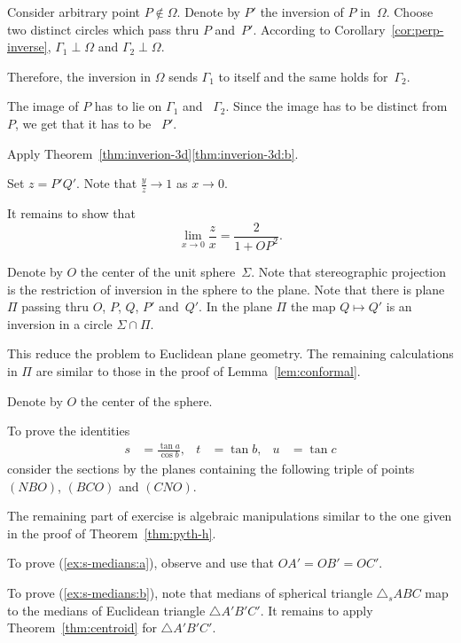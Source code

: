 Consider arbitrary point $P\notin\Omega$.
Denote by $P'$ the inversion of $P$ in~$\Omega$.
Choose two distinct circles which pass thru $P$ and~$P'$.
According to Corollary~\ref{cor:perp-inverse}, 
$\Gamma_1\perp \Omega$ and $\Gamma_2\perp \Omega$.

Therefore, the inversion in $\Omega$ sends $\Gamma_1$ to itself and the same holds for~$\Gamma_2$. 

The image of $P$ has to lie on $\Gamma_1$ and ~$\Gamma_2$.
Since the image has to be distinct from $P$, we get that it has to be ~$P'$.

Apply Theorem~\ref{thm:inverion-3d}\ref{thm:inverion-3d:b}.

Set $z=P'Q'$.
Note that $\tfrac yz\to 1$ as $x\to 0$.

It remains to show that 
$$\lim_{x\to 0} \frac{z}{x}=\frac{2}{1+OP^2}.$$

Denote by $O$ the center of the unit sphere~$\Sigma$.
Note that stereographic projection is the restriction of inversion in the sphere to the plane.
Note that there is plane $\Pi$ passing thru $O$, $P$, $Q$, $P'$ and~$Q'$.
In the plane $\Pi$ the map $Q\mapsto Q'$ is an inversion in a circle $\Sigma\cap \Pi$.

This reduce the problem to Euclidean plane geometry.
The remaining calculations in $\Pi$ are similar to those in the proof of  Lemma~\ref{lem:conformal}.



Denote by $O$ the center of the sphere.

To prove the identities
\begin{align*}
s&=\tfrac{\tan a}{\cos b},
&
t&=\tan b,
&
u&=\tan c
\end{align*}
consider the sections by the planes containing the following triple of points $(NBO)$, $(BCO)$ and $(CNO)$.

The remaining part of exercise is algebraic manipulations similar to the one given in the proof of Theorem~\ref{thm:pyth-h}.

To prove (\ref{ex:s-medians:a}),
observe and use that 
$OA'=OB'=OC'$.

To prove (\ref{ex:s-medians:b}), note that medians of spherical triangle $\triangle_s ABC$ 
map to the medians of Euclidean triangle $\triangle A'B'C'$.
It remains to apply Theorem~\ref{thm:centroid} for $\triangle A'B'C'$.


